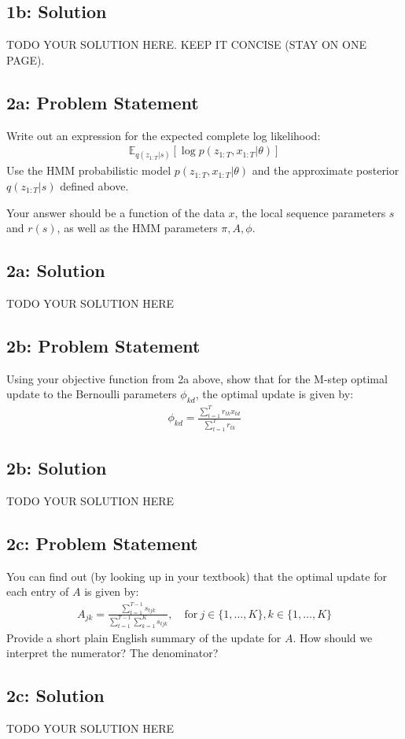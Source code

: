 \documentclass[10pt]{article}
\newcommand{\officialdirections}[1]{{\color{purple} #1}}
\begin{document}
\subsection{1b: Solution}
TODO YOUR SOLUTION HERE. KEEP IT CONCISE (STAY ON ONE PAGE).


\newpage
\officialdirections{
\subsection*{2a: Problem Statement}
Write out an expression for the expected complete log likelihood:
\begin{align}
\mathbb{E}_{q(z_{1:T} |s)} \left[ \log p(z_{1:T}, x_{1:T} | \theta) \right]	
\end{align}
Use the HMM probabilistic model $p(z_{1:T}, x_{1:T} | \theta)$ and the approximate posterior $q(z_{1:T} | s)$ defined above. 

Your answer should be a function of the data $x$, the local sequence parameters $s$ and $r(s)$, as well as the HMM parameters $\pi, A, \phi$.
}


\subsection{2a: Solution}

TODO YOUR SOLUTION HERE


\newpage
\officialdirections{
\subsection*{2b: Problem Statement}
Using your objective function from 2a above, show that for the M-step optimal update to the Bernoulli parameters $\phi_{kd}$, the optimal update is given by:
\begin{align}
\phi_{kd} = \frac{ \sum_{t=1}^T r_{tk} x_{td} }{ \sum_{t=1}^T r_{tk} }
\end{align}
}

\subsection{2b: Solution}
TODO YOUR SOLUTION HERE



\newpage
\officialdirections{
\subsection*{2c: Problem Statement}
You can find out (by looking up in your textbook) that the optimal update for each entry of $A$ is given by:
\begin{align}
A_{jk} = \frac{ \sum_{t=1}^{T-1} s_{tjk}}{ \sum_{t=1}^{T-1} \sum_{k=1}^K s_{tjk}}, \quad \text{for}~ j \in \{1, \ldots, K\}, k \in \{1, \ldots, K\}
\end{align}
Provide a short plain English summary of the update for $A$. How should we interpret the numerator? The denominator? 
}


\subsection{2c: Solution}
TODO YOUR SOLUTION HERE
\end{document}
